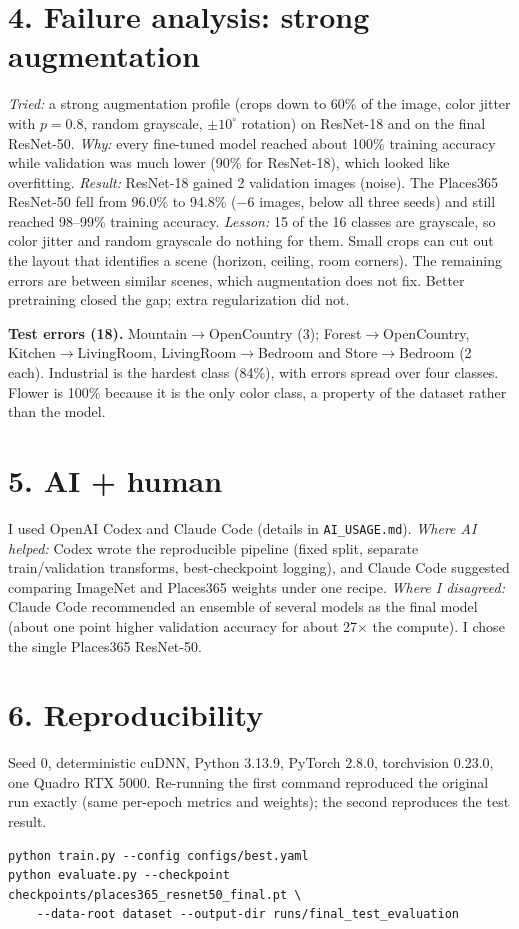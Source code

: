 \documentclass[10pt]{article}
\begin{document}
\section*{4. Failure analysis: strong augmentation}
\emph{Tried:} a strong augmentation profile (crops down to 60\% of the image,
color jitter with $p=0.8$, random grayscale, $\pm10^\circ$ rotation) on
ResNet-18 and on the final ResNet-50.
\emph{Why:} every fine-tuned model reached about 100\% training accuracy while
validation was much lower (90\% for ResNet-18), which looked like overfitting.
\emph{Result:} ResNet-18 gained 2 validation images (noise). The Places365
ResNet-50 fell from 96.0\% to 94.8\% ($-$6 images, below all three seeds) and
still reached 98--99\% training accuracy.
\emph{Lesson:} 15 of the 16 classes are grayscale, so color jitter and random
grayscale do nothing for them. Small crops can cut out the layout that
identifies a scene (horizon, ceiling, room corners). The remaining errors are
between similar scenes, which augmentation does not fix. Better pretraining
closed the gap; extra regularization did not.

\textbf{Test errors (18).} Mountain$\to$OpenCountry (3); Forest$\to$OpenCountry,
Kitchen$\to$LivingRoom, LivingRoom$\to$Bedroom and Store$\to$Bedroom (2 each).
Industrial is the hardest class (84\%), with errors spread over four classes.
Flower is 100\% because it is the only color class, a property of the dataset
rather than the model.

\section*{5. AI + human}
I used OpenAI Codex and Claude Code (details in \texttt{AI\_USAGE.md}).
\emph{Where AI helped:} Codex wrote the reproducible pipeline (fixed split,
separate train/validation transforms, best-checkpoint logging), and Claude Code
suggested comparing ImageNet and Places365 weights under one recipe.
\emph{Where I disagreed:} Claude Code recommended an ensemble of several models
as the final model (about one point higher validation accuracy for about
27$\times$ the compute). I chose the single Places365 ResNet-50.

\section*{6. Reproducibility}
Seed 0, deterministic cuDNN, Python 3.13.9, PyTorch 2.8.0, torchvision 0.23.0,
one Quadro RTX 5000. Re-running the first command reproduced the original run
exactly (same per-epoch metrics and weights); the second reproduces the test
result.
\vspace{-4pt}
{\footnotesize
\begin{verbatim}
python train.py --config configs/best.yaml
python evaluate.py --checkpoint checkpoints/places365_resnet50_final.pt \
    --data-root dataset --output-dir runs/final_test_evaluation
\end{verbatim}}
\end{document}
